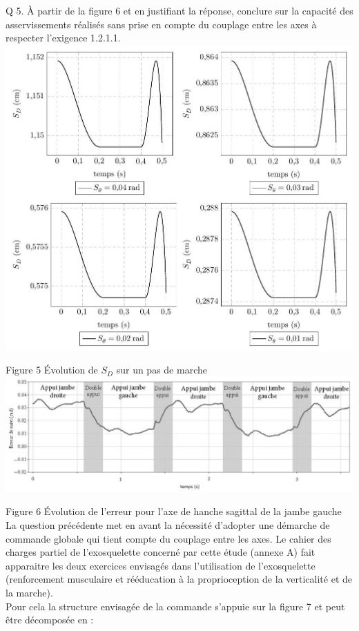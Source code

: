 \documentclass[10pt]{article}
\begin{document}
Q 5. À partir de la figure 6 et en justifiant la réponse, conclure sur la capacité des asservissements réalisés sans prise en compte du couplage entre les axes à respecter l'exigence 1.2.1.1.\\
\includegraphics[max width=\textwidth, center]{2025_07_03_97545f5dc188959e5663g-04(2)}

Figure 5 Évolution de $S_{D}$ sur un pas de marche\\
\includegraphics[max width=\textwidth, center]{2025_07_03_97545f5dc188959e5663g-04(1)}

Figure 6 Évolution de l'erreur pour l'axe de hanche sagittal de la jambe gauche\\
La question précédente met en avant la nécessité d'adopter une démarche de commande globale qui tient compte du couplage entre les axes. Le cahier des charges partiel de l'exosquelette concerné par cette étude (annexe A) fait apparaitre les deux exercices envisagés dans l'utilisation de l'exosquelette (renforcement musculaire et rééducation à la proprioception de la verticalité et de la marche).\\
Pour cela la structure envisagée de la commande s'appuie sur la figure 7 et peut être décomposée en :
\end{document}
